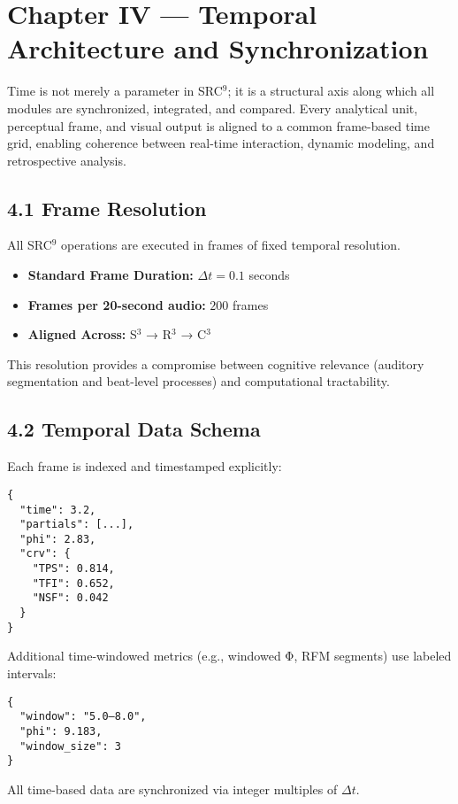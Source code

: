 \documentclass[10pt]{article}
\begin{document}
\section*{Chapter IV — Temporal Architecture and Synchronization}

Time is not merely a parameter in SRC$^{9}$; it is a structural axis along which all modules are synchronized, integrated, and compared. Every analytical unit, perceptual frame, and visual output is aligned to a common frame-based time grid, enabling coherence between real-time interaction, dynamic modeling, and retrospective analysis.

\subsection*{4.1 Frame Resolution}

All SRC$^{9}$ operations are executed in frames of fixed temporal resolution.

\begin{itemize}
  \item \textbf{Standard Frame Duration:} $\Delta t = 0.1$ seconds
  \item \textbf{Frames per 20-second audio:} $200$ frames
  \item \textbf{Aligned Across:} S$^3$ → R$^3$ → C$^3$
\end{itemize}

This resolution provides a compromise between cognitive relevance (auditory segmentation and beat-level processes) and computational tractability.

\subsection*{4.2 Temporal Data Schema}

Each frame is indexed and timestamped explicitly:

\begin{verbatim}
{
  "time": 3.2,
  "partials": [...],
  "phi": 2.83,
  "crv": {
    "TPS": 0.814,
    "TFI": 0.652,
    "NSF": 0.042
  }
}
\end{verbatim}

Additional time-windowed metrics (e.g., windowed Φ, RFM segments) use labeled intervals:

\begin{verbatim}
{
  "window": "5.0–8.0",
  "phi": 9.183,
  "window_size": 3
}
\end{verbatim}

All time-based data are synchronized via integer multiples of $\Delta t$.
\end{document}
